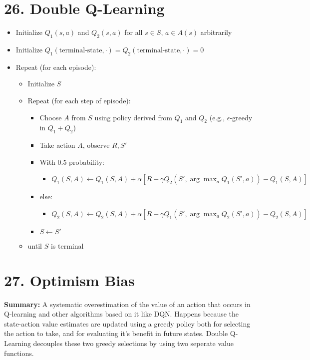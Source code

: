 \documentclass[letterpaper,10pt]{article}
\begin{document}
\begin{multicols}{2}
\section*{26. Double Q-Learning}
\begin{itemize}
    \item Initialize \( Q_1(s,a) \) and \( Q_2(s,a) \) for all \( s \in S \), \( a \in A(s) \) arbitrarily
    \item Initialize \( Q_1(\text{terminal-state}, \cdot) = Q_2(\text{terminal-state}, \cdot) = 0 \)
    \item Repeat (for each episode):
    \begin{itemize}
        \item Initialize \( S \)
        \item Repeat (for each step of episode):
        \begin{itemize}
            \item Choose \( A \) from \( S \) using policy derived from \( Q_1 \) and \( Q_2 \) (e.g., \(\epsilon\)-greedy in \( Q_1 + Q_2 \))
            \item Take action \( A \), observe \( R, S' \)
            \item With 0.5 probability:
            \begin{itemize}
                \item \( Q_1(S,A) \leftarrow Q_1(S,A) + \alpha [R + \gamma Q_2(S', \arg \max_{a} Q_1(S',a)) - Q_1(S,A)] \)
            \end{itemize}
            \item else:
            \begin{itemize}
                \item \( Q_2(S,A) \leftarrow Q_2(S,A) + \alpha [R + \gamma Q_1(S', \arg \max_{a} Q_2(S',a)) - Q_2(S,A)] \)
            \end{itemize}
            \item \( S \leftarrow S' \)
        \end{itemize}
        \item until \( S \) is terminal
    \end{itemize}
\end{itemize}

\section*{27. Optimism Bias}
\textbf{Summary:} A systematic overestimation of the value of an action that occurs in Q-learning and other algorithms based on it like DQN. Happens because the state-action value estimates are updated using a greedy policy both for selecting the action to take, and for evaluating it's benefit in future states. Double Q-Learning decouples these two greedy selections by using two seperate value functions.


\end{multicols}
\end{document}
